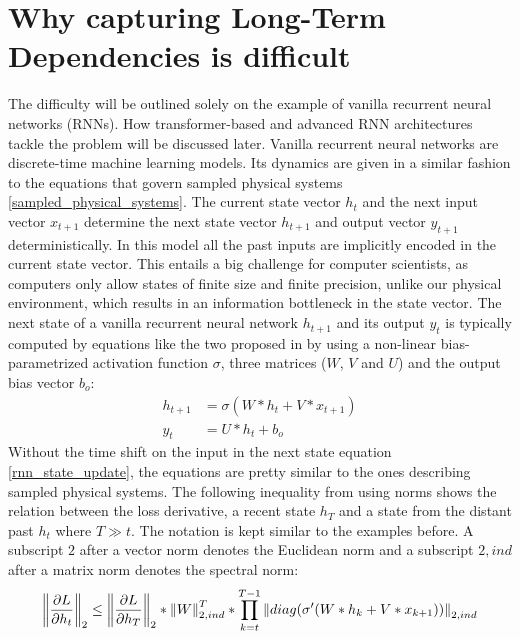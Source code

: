 \documentclass[draft,final]{vutinfth} %
\begin{document}
    \section{Why capturing Long-Term Dependencies is difficult} \label{long_term_difficult}
    The difficulty will be outlined solely on the example of vanilla recurrent neural networks (RNNs).
    How transformer-based and advanced RNN architectures tackle the problem will be discussed later.
    Vanilla recurrent neural networks are discrete-time machine learning models. 
    Its dynamics are given in a similar fashion to the equations that govern sampled physical systems \ref{sampled_physical_systems}.
    The current state vector $h_{t}$ and the next input vector $x_{t+1}$ determine the next state vector $h_{t+1}$ and output vector $y_{t+1}$ deterministically.
    In this model all the past inputs are implicitly encoded in the current state vector.
    This entails a big challenge for computer scientists, as computers only allow states of finite size and finite precision, unlike our physical environment, which results in an information bottleneck in the state vector.
    The next state of a vanilla recurrent neural network $h_{t+1}$ and its output $y_{t}$ is typically computed by equations like the two proposed in \cite[p. 2]{UnitaryRNNs} by using a non-linear bias-parametrized activation function $\sigma$, three matrices ($W$, $V$ and $U$) and the output bias vector $b_o$:
    \begin{align}
        \label{rnn_state_update}
        h_{t+1} &= \sigma(W*h_t + V*x_{t+1}) \\
        \label{rnn_output}
        y_{t} &= U*h_{t} + b_o
    \end{align}
    Without the time shift on the input in the next state equation \ref{rnn_state_update}, the equations are pretty similar to the ones describing sampled physical systems.
    The following inequality from \cite[p. 2]{UnitaryRNNs} using norms shows the relation between the loss derivative, a recent state $h_T$ and a state from the distant past $h_t$ where $T \gg t$.
    The notation is kept similar to the examples before. A subscript $2$ after a vector norm denotes the Euclidean norm and a subscript $2,ind$ after a matrix norm denotes the spectral norm:
    \begin{align}
        \label{gradient_formula}
        \left\Vert \pdv{L}{h_t} \right\Vert_2 \leq \left\Vert \pdv{L}{h_T} \right\Vert_2 * \left\Vert W \right\Vert_{2,ind}^T * \prod^{T-1}_{k=t} \left\Vert diag(\sigma'(W*h_k + V*x_{k+1})) \right\Vert_{2,ind}
    \end{align}
\end{document}
